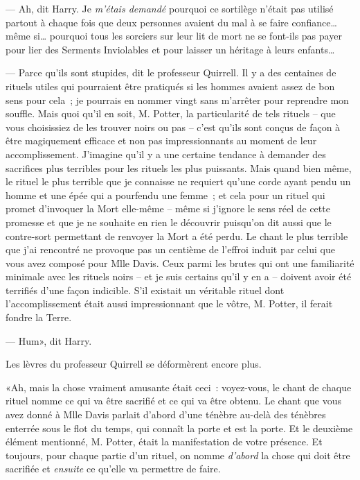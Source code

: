 --- Ah, dit Harry. Je \emph{m'étais demandé} pourquoi ce sortilège n'était pas utilisé partout à chaque fois que deux personnes avaient du mal à se faire confiance… même si… pourquoi tous les sorciers sur leur lit de mort ne se font-ils pas payer pour lier des Serments Inviolables et pour laisser un héritage à leurs enfants…

--- Parce qu'ils sont stupides, dit le professeur Quirrell. Il y a des centaines de rituels utiles qui pourraient être pratiqués si les hommes avaient assez de bon sens pour cela~; je pourrais en nommer vingt sans m'arrêter pour reprendre mon souffle. Mais quoi qu'il en soit, M. Potter, la particularité de tels rituels -- que vous choisissiez de les trouver noirs ou pas -- c'est qu'ils sont conçus de façon à être magiquement efficace et non pas impressionnants au moment de leur accomplissement. J'imagine qu'il y a une certaine tendance à demander des sacrifices plus terribles pour les rituels les plus puissants. Mais quand bien même, le rituel le plus terrible que je connaisse ne requiert qu'une corde ayant pendu un homme et une épée qui a pourfendu une femme~; et cela pour un rituel qui promet d'invoquer la Mort elle-même -- même si j'ignore le sens réel de cette promesse et que je ne souhaite en rien le découvrir puisqu'on dit aussi que le contre-sort permettant de renvoyer la Mort a été perdu. Le chant le plus terrible que j'ai rencontré ne provoque pas un centième de l'effroi induit par celui que vous avez composé pour Mlle Davis. Ceux parmi les brutes qui ont une familiarité minimale avec les rituels noirs -- et je suis certains qu'il y en a -- doivent avoir été terrifiés d'une façon indicible. S'il existait un véritable rituel dont l'accomplissement était aussi impressionnant que le vôtre, M. Potter, il ferait fondre la Terre.

--- Hum», dit Harry.

Les lèvres du professeur Quirrell se déformèrent encore plus.

«Ah, mais la chose vraiment amusante était ceci~: voyez-vous, le chant de chaque rituel nomme ce qui va être sacrifié et ce qui va être obtenu. Le chant que vous avez donné à Mlle Davis parlait d'abord d'une ténèbre au-delà des ténèbres enterrée sous le flot du temps, qui connaît la porte et est la porte. Et le deuxième élément mentionné, M. Potter, était la manifestation de votre présence. Et toujours, pour chaque partie d'un rituel, on nomme \emph{d'abord} la chose qui doit être sacrifiée et \emph{ensuite} ce qu'elle va permettre de faire.

